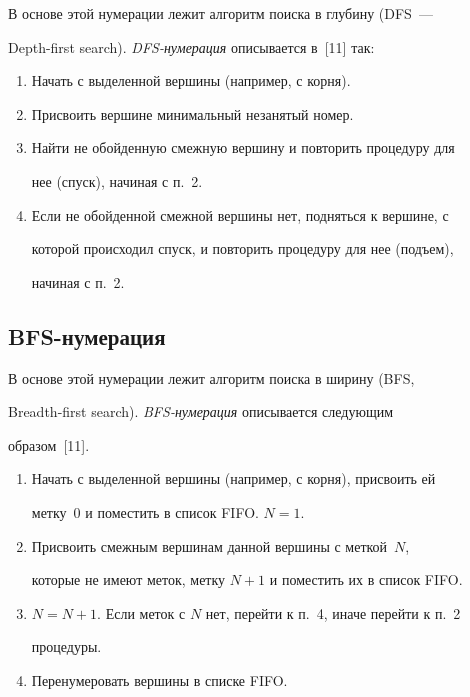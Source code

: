       В основе этой нумерации лежит алгоритм поиска в глубину (DFS~--- 


Depth-first search). \textit{DFS-нумерация}  описывается в~[11] так:


      


      \noindent


      \begin{enumerate}[1.]


\item Начать с выделенной вершины (например, с корня).


\item Присвоить вершине минимальный незанятый номер.


\item Найти не обойденную смежную вершину и повторить процедуру для 


нее (спуск), начиная с п.~2.


\item Если не обойденной смежной вершины нет, подняться к вершине, с 


которой происходил спуск, и повторить процедуру для нее (подъем), 


начиная с п.~2.


\end{enumerate}





\subsection{BFS-нумерация}





      В основе этой нумерации лежит алгоритм поиска в ширину (BFS, 


Breadth-first search). \textit{BFS-нумерация}  описывается следующим 


образом~[11].


      


      \noindent


      \begin{enumerate}[1.]


\item Начать с выделенной вершины (например, с корня), присвоить ей 


метку~0 и поместить в список FIFO. $N=1$.


\item Присвоить смежным вершинам данной вершины с меткой~$N$, 


которые не имеют меток, метку $N+1$ и поместить их в список FIFO.


\item $N=N+1$. Если меток с $N$ нет, перейти к п.~4, иначе перейти к п.~2 


процедуры.


\item Перенумеровать вершины в списке FIFO.


\end{enumerate}





